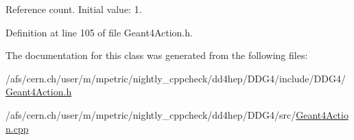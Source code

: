 Reference count. Initial value\+: 1. 



Definition at line 105 of file Geant4\+Action.\+h.



The documentation for this class was generated from the following files\+:\begin{DoxyCompactItemize}
\item 
/afs/cern.\+ch/user/m/mpetric/nightly\+\_\+cppcheck/dd4hep/\+D\+D\+G4/include/\+D\+D\+G4/\hyperlink{_geant4_action_8h}{Geant4\+Action.\+h}\item 
/afs/cern.\+ch/user/m/mpetric/nightly\+\_\+cppcheck/dd4hep/\+D\+D\+G4/src/\hyperlink{_geant4_action_8cpp}{Geant4\+Action.\+cpp}\end{DoxyCompactItemize}
